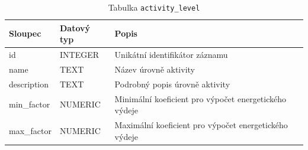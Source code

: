 \begin{table}[ht!]
    \centering
    \begin{tabularx}{\textwidth}{|l|l|L|}
        \hline
        \textbf{Sloupec} & \textbf{Datový typ} & \textbf{Popis}                                        \\ \hline
        id               & INTEGER             & Unikátní identifikátor záznamu                        \\ \hline
        name             & TEXT                & Název úrovně aktivity                                 \\ \hline
        description      & TEXT                & Podrobný popis úrovně aktivity                        \\ \hline
        min\_factor      & NUMERIC             & Minimální koeficient pro výpočet energetického výdeje \\ \hline
        max\_factor      & NUMERIC             & Maximální koeficient pro výpočet energetického výdeje \\ \hline
    \end{tabularx}
    \caption{Tabulka \texttt{activity\_level}}
    \label{tab:activity_level}
\end{table}
